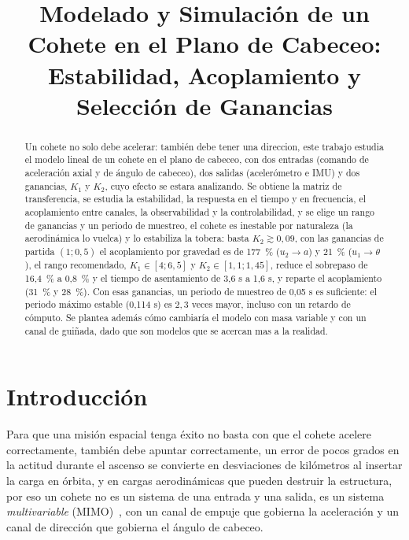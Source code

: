 \documentclass[article, 11pt]{IEEEtran}   %
\begin{document}
\title{Modelado y Simulaci\'on de un Cohete en el Plano de Cabeceo:\\ Estabilidad, Acoplamiento y Selecci\'on de Ganancias}

\author{
}

\maketitle

\begin{abstract}
Un cohete no solo debe acelerar: tambi\'en debe tener una direccion, este trabajo estudia el modelo lineal de un cohete en el plano de cabeceo, con dos entradas (comando de aceleraci\'on axial y de \'angulo de cabeceo), dos salidas (aceler\'ometro e IMU) y dos ganancias, $K_1$ y $K_2$, cuyo efecto se estara analizando. Se obtiene la matriz de transferencia, se estudia la estabilidad, la respuesta en el tiempo y en frecuencia, el acoplamiento entre canales, la observabilidad y la controlabilidad, y se elige un rango de ganancias y un periodo de muestreo, el cohete es inestable por naturaleza (la aerodin\'amica lo vuelca) y lo estabiliza la tobera: basta $K_2\gtrsim0{,}09$, con las ganancias de partida $(1;0{,}5)$ el acoplamiento por gravedad es de 177~\% ($u_2\to a$) y 21~\% ($u_1\to\theta$), el rango recomendado, $K_1\in[4;6{,}5]$ y $K_2\in[1{,}1;1{,}45]$, reduce el sobrepaso de 16,4~\% a 0,8~\% y el tiempo de asentamiento de 3,6 s a 1,6 s, y reparte el acoplamiento (31~\% y 28~\%). Con esas ganancias, un periodo de muestreo de 0,05 s es suficiente: el periodo m\'aximo estable (0,114 s) es $2{,}3$ veces mayor, incluso con un retardo de c\'omputo. Se plantea adem\'as c\'omo cambiar\'ia el modelo con masa variable y con un canal de gui\~nada, dado que son modelos que se acercan mas a la realidad.
\end{abstract}

\section{Introducci\'on}
Para que una misi\'on espacial tenga \'exito no basta con que el cohete acelere correctamente, tambi\'en debe apuntar correctamente, un error de pocos grados en la actitud durante el ascenso se convierte en desviaciones de kil\'ometros al insertar la carga en \'orbita, y en cargas aerodin\'amicas que pueden destruir la estructura, por eso un cohete no es un sistema de una entrada y una salida, es un sistema \emph{multivariable} (MIMO)~\cite{skogestad}, con un canal de empuje que gobierna la aceleraci\'on y un canal de direcci\'on que gobierna el \'angulo de cabeceo.
\end{document}
